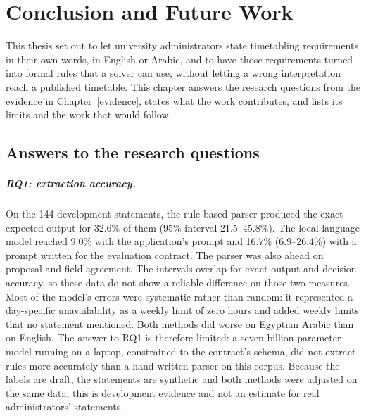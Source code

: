 \chapter{Conclusion and Future Work}\label{chap:conclusion}


This thesis set out to let university administrators state timetabling requirements in their own words, in English or Arabic, and to have those requirements turned into formal rules that a solver can use, without letting a wrong interpretation reach a published timetable. This chapter answers the research questions from the evidence in Chapter~\ref{evidence}, states what the work contributes, and lists its limits and the work that would follow.

\section{Answers to the research questions}

\paragraph{RQ1: extraction accuracy.} On the 144 development statements, the rule-based parser produced the exact expected output for 32.6\% of them (95\% interval 21.5--45.8\%). The local language model reached 9.0\% with the application's prompt and 16.7\% (6.9--26.4\%) with a prompt written for the evaluation contract. The parser was also ahead on proposal and field agreement. The intervals overlap for exact output and decision accuracy, so these data do not show a reliable difference on those two measures. Most of the model's errors were systematic rather than random: it represented a day-specific unavailability as a weekly limit of zero hours and added weekly limits that no statement mentioned. Both methods did worse on Egyptian Arabic than on English. The answer to RQ1 is therefore limited: a seven-billion-parameter model running on a laptop, constrained to the contract's schema, did not extract rules more accurately than a hand-written parser on this corpus. Because the labels are draft, the statements are synthetic and both methods were adjusted on the same data, this is development evidence and not an estimate for real administrators' statements.


